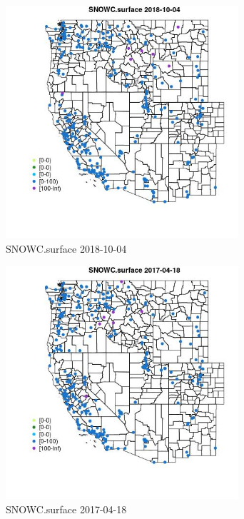 \begin{figure} 
\centering  
\includegraphics[width=0.77\textwidth]{Code_Outputs/Report_ML_input_PM25_Step4_part_f_de_duplicated_aves_prioritize_24hr_obswNAs_MapObsSNOWCsurface2018-10-04.jpg} 
\caption{\label{fig:Report_ML_input_PM25_Step4_part_f_de_duplicated_aves_prioritize_24hr_obswNAsMapObsSNOWCsurface2018-10-04}SNOWC.surface 2018-10-04} 
\end{figure} 
 

\begin{figure} 
\centering  
\includegraphics[width=0.77\textwidth]{Code_Outputs/Report_ML_input_PM25_Step4_part_f_de_duplicated_aves_prioritize_24hr_obswNAs_MapObsSNOWCsurface2017-04-18.jpg} 
\caption{\label{fig:Report_ML_input_PM25_Step4_part_f_de_duplicated_aves_prioritize_24hr_obswNAsMapObsSNOWCsurface2017-04-18}SNOWC.surface 2017-04-18} 
\end{figure} 
 

